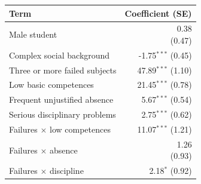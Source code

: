 \begin{tabular}{lr}
\toprule
Term & Coefficient (SE) \\
\midrule
Male student & \shortstack{0.38\\{\scriptsize (0.47)}} \\
Complex social background & \shortstack{-1.75$^{***}$\\{\scriptsize (0.45)}} \\
Three or more failed subjects & \shortstack{47.89$^{***}$\\{\scriptsize (1.10)}} \\
Low basic competences & \shortstack{21.45$^{***}$\\{\scriptsize (0.78)}} \\
Frequent unjustified absence & \shortstack{5.67$^{***}$\\{\scriptsize (0.54)}} \\
Serious disciplinary problems & \shortstack{2.75$^{***}$\\{\scriptsize (0.62)}} \\
Failures $\times$ low competences & \shortstack{11.07$^{***}$\\{\scriptsize (1.21)}} \\
Failures $\times$ absence & \shortstack{1.26\\{\scriptsize (0.93)}} \\
Failures $\times$ discipline & \shortstack{2.18$^{*}$\\{\scriptsize (0.92)}} \\
\bottomrule
\end{tabular}
